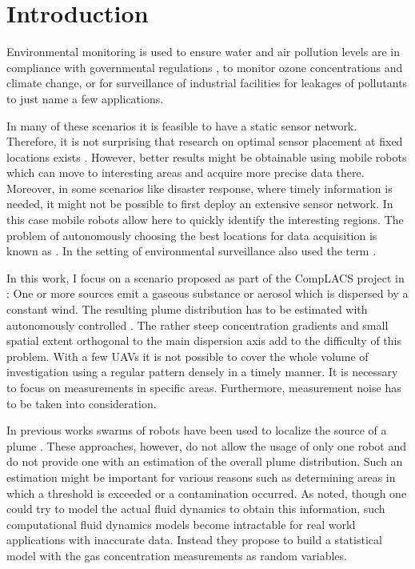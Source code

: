 \chapter{Introduction}
Environmental monitoring is used to ensure water and air pollution levels are in
compliance with governmental regulations \parencite[i.\,e.][]{Anonymous:1996ui}, 
to monitor ozone concentrations and climate change, or for surveillance of 
industrial facilities for leakages of pollutants to just name a few 
applications.

In many of these scenarios it is feasible to have a static sensor network.  
Therefore, it is not surprising that research on optimal sensor placement at 
fixed locations exists \parencite[e.\,g.][]{Osborne:2008hi, Guestrin:2005cq, 
    Wang:kz}.  However, better results might be obtainable using mobile robots 
which can move to interesting areas and acquire more precise data there.  
Moreover, in some scenarios like disaster response, where timely information is 
needed, it might not be possible to first deploy an extensive sensor network. In 
this case mobile robots allow here to quickly identify the interesting regions.  
The problem of autonomously choosing the best locations for data acquisition is 
known as . In the setting of environmental surveillance 
\textcite{Marchant:2012wb} also used the term .

In this work, I focus on a scenario proposed as part of the CompLACS project in 
\textcite{denardi2013rn}: One or more sources emit a gaseous substance or 
aerosol which is dispersed by a constant wind. The resulting plume distribution 
has to be estimated with autonomously controlled . The rather steep concentration gradients and small spatial 
extent orthogonal to the main dispersion axis add to the difficulty of this 
problem.  With a few UAVs it is not possible to cover the whole volume of 
investigation using a regular pattern densely in a timely manner.  It is 
necessary to focus on measurements in specific areas.  Furthermore, measurement 
noise has to be taken into consideration.

In previous works swarms of robots have been used to localize the source of 
a plume \parencite{Jatmiko:2007df, Zarzhitsky:2005tz}. These approaches, 
however, do not allow the usage of only one robot and do not provide one with an 
estimation of the overall plume distribution. Such an estimation might be 
important for various reasons such as determining areas in which a threshold is 
exceeded or a contamination occurred. As \textcite{Reggente:2009ti} noted, 
though one could try to model the actual fluid dynamics to obtain this 
information, such computational fluid dynamics models become intractable for 
real world applications with inaccurate data.  Instead they propose to build 
a statistical model with the gas concentration measurements as random variables.

